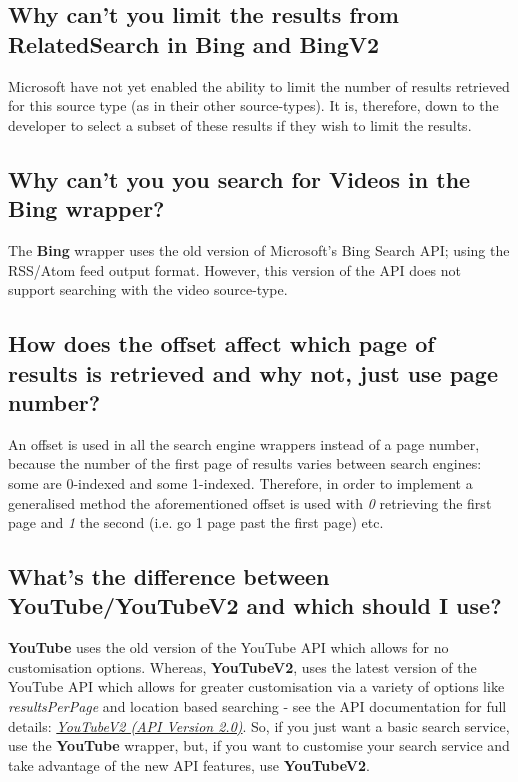 \documentclass[letterpaper,10pt,english]{sphinxmanual}
\begin{document}
\subsection{Why can't you limit the results from RelatedSearch in Bing and BingV2}
\label{faq:why-can-t-you-limit-the-results-from-relatedsearch-in-bing-and-bingv2}
Microsoft have not yet enabled the ability to limit the number of results retrieved for this source type (as in their other source-types). It is, therefore, down to the developer to select a subset of these results if they wish to limit the results.


\subsection{Why can't you you search for Videos in the Bing wrapper?}
\label{faq:why-can-t-you-you-search-for-videos-in-the-bing-wrapper}
The \textbf{Bing} wrapper uses the old version of Microsoft's Bing Search API; using the RSS/Atom feed output format. However, this version of the API does not support searching with the video source-type.


\subsection{How does the offset affect which page of results is retrieved and why not, just use page number?}
\label{faq:how-does-the-offset-affect-which-page-of-results-is-retrieved-and-why-not-just-use-page-number}
An offset is used in all the search engine wrappers instead of a page number, because the number of the first page of results varies between search engines: some are 0-indexed and some 1-indexed. Therefore, in order to implement a generalised method the aforementioned offset is used with \emph{0} retrieving the first page and \emph{1} the second (i.e. go 1 page past the first page) etc.


\subsection{What's the difference between YouTube/YouTubeV2 and which should I use?}
\label{faq:what-s-the-difference-between-youtube-youtubev2-and-which-should-i-use}
\textbf{YouTube} uses the old version of the YouTube API which allows for no customisation options. Whereas, \textbf{YouTubeV2}, uses the latest version of the YouTube API which allows for greater customisation via a variety of options like \emph{resultsPerPage} and location based searching - see the API documentation for full details: {\hyperref[api3.0:puppy-youtubev2]{\emph{YouTubeV2 (API Version 2.0)}}}. So, if you just want a basic search service, use the \textbf{YouTube} wrapper, but, if you want to customise your search service and take advantage of the new API features, use \textbf{YouTubeV2}.
\end{document}
